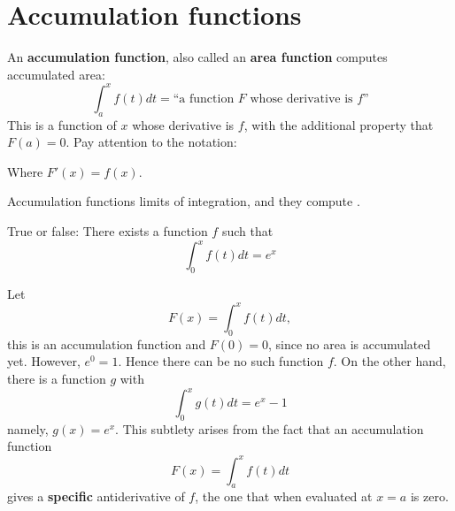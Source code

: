 \documentclass{ximera}
\begin{document}
\section{Accumulation functions}

An \textbf{accumulation function}, also called an \textbf{area function}
computes accumulated area:
\[
\int_a^x f(t) dt = \text{``a function $F$ whose derivative is $f$''}
\]
This is a function of $x$ whose derivative is $f$, with the additional
property that $F(a)=0$.  Pay attention to the notation:
\begin{image}
\end{image}
Where $F'(x) = f(x)$.
\begin{explanation}%
  Accumulation functions  limits of integration, and they compute
  .
\end{explanation}
\begin{question}
  True or false: There exists a function $f$ such that 
  \[
  \int_0^x f(t) dt = e^x
  \]
  \begin{prompt}
  \begin{multipleChoice}
  \end{multipleChoice}
  \begin{feedback}
    Let
    \[
    F(x) = \int_0^x f(t) dt,
    \]
    this is an accumulation function and $F(0) = 0$, since no area is
    accumulated yet. However, $e^0 =1$. Hence there can be no such
    function $f$. On the other hand, there is a function $g$ with
     \[
     \int_0^x g(t) dt = e^x-1
     \]
     namely, $g(x) = e^x$. This subtlety arises from the fact that an
     accumulation function
     \[
     F(x) = \int_a^x f(t) dt
     \]
     gives a \textbf{specific} antiderivative of $f$, the one that
     when evaluated at $x=a$ is zero.
  \end{feedback}
  \end{prompt}
\end{question}
\end{document}
